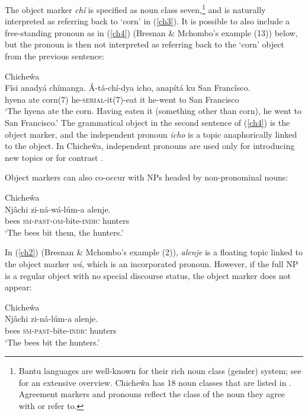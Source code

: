 \documentclass[output=paper,hidelinks]{langscibook}
\begin{document}
\noindent    The  object marker  \textit{chí} is specified as noun class seven,\footnote{Bantu languages are well-known for their rich noun class (gender) system; see \citet{katamba03} for an extensive overview.    Chiche\^{w}a has 18 noun classes that are listed in \citet[Table 1]{BM87}.  Agreement markers and pronouns reflect the class of the noun they agree with or refer to.}  and is  naturally  interpreted  as  referring back to  `corn' in (\ref{ch3}).
  It  is  possible  to also  include a free-standing  pronoun as in  (\ref{ch4}) (Bresnan \& Mchombo's example (13)) below, but   the pronoun is  then not  interpreted as referring back  to  the `corn' object  from the previous  sentence:
  
\ea \label{ch4}Chiche\^wa\\ \gll Fîsi  anadyá  chímanga.  Á-tá-chí-dya icho, anapítá ku San  Francîsco.  \\
hyena  ate corn(7) he-\textsc{serial}-it(7)-eat it he-went to San Francisco   \\
\glt `The  hyena ate the corn. Having  eaten it (something  other than  corn), he  went  to  San Francisco.'
\z
The grammatical object in the second sentence of  (\ref{ch4}) is   the object marker, and  the independent  pronoun \textit{icho}  is   a  topic  anaphorically linked to the  object.    In  Chiche\^{w}a,  independent  pronouns are  used  only  for introducing  new  topics or for contrast  \citep[748]{BM87}.   
 
 
 
 Object markers  can also co-occur  with NPs headed  by non-pronominal nouns: 
  
  \ea \label{ch2}Chiche\^wa\\ \gll Njâchi  zi-ná-wá-lúm-a  alenje. \\
    bees  \textsc{sm}-\textsc{past}-\textsc{om}-bite-\textsc{indic} hunters   \\
  \glt `The bees bit  them, the hunters.'
  \z
  
 \noindent In  (\ref{ch2}) (Bresnan \& Mchombo's example (2)),  \textit{alenje}  is a floating  topic  linked to  the object  marker  \textit{wá}, which is  an incorporated pronoun.  However, if  the  full  NP  is a regular object  with no special discourse status, the object  marker  does not appear:
 
  \ea \label{ch1}Chiche\^wa\\ \gll Njâchi  zi-ná-lúm-a  alenje. \\
    bees  \textsc{sm}-\textsc{past}-bite-\textsc{indic} hunters  \\
  \glt `The bees bit  the hunters.'
  \z
  
\end{document}
